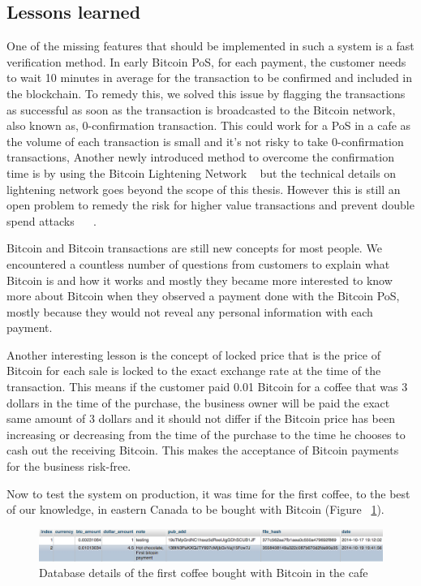 \subsection{Lessons learned}
One of the missing features that should be implemented in such a system is a fast verification method. In early Bitcoin PoS, for each payment, the customer needs to wait 10 minutes in average for the transaction to be confirmed and included in the blockchain. To remedy this, we solved this issue by flagging the transactions as successful as soon as the transaction is broadcasted to the Bitcoin network, also known as, 0-confirmation transaction. This could work for a PoS in a cafe as the volume of each transaction is small and it's not risky to take 0-confirmation transactions, Another newly introduced method to overcome the confirmation time is by using the Bitcoin Lightening Network ~\cite{poon2015bitcoin} but the technical details on lightening network goes beyond the scope of this thesis. However this is still an open problem to remedy the risk for higher value transactions and prevent double spend attacks ~\cite{karame2012two} ~\cite{bamert2013have}. 

Bitcoin and Bitcoin transactions are still new concepts for most people. We encountered a countless number of questions from customers to explain what Bitcoin is and how it works and mostly they became more interested to know more about Bitcoin when they observed a payment done with the Bitcoin PoS, mostly because they would not reveal any personal information with each payment.

Another interesting lesson is the concept of locked price that is the price of Bitcoin for each sale is locked to the exact exchange rate at the time of the transaction. This means if the customer paid 0.01 Bitcoin for a coffee that was 3 dollars in the time of the purchase, the business owner will be paid the exact same amount of 3 dollars and it should not differ if the Bitcoin price has been increasing or decreasing from the time of the purchase to the time he chooses to cash out the receiving Bitcoin. This makes the acceptance of Bitcoin payments for the business risk-free.

Now to test the system on production, it was time for the first coffee, to the best of our knowledge, in eastern Canada to be bought with Bitcoin (Figure ~\ref{fig:firsttransaction}).

\begin{figure}[htb!p]
\centering
\includegraphics[width=\linewidth]{fig/first_cafe_transaction.png}
  \caption{Database details of the first coffee bought with Bitcoin in the cafe}
\label{fig:firsttransaction}
\end{figure}



